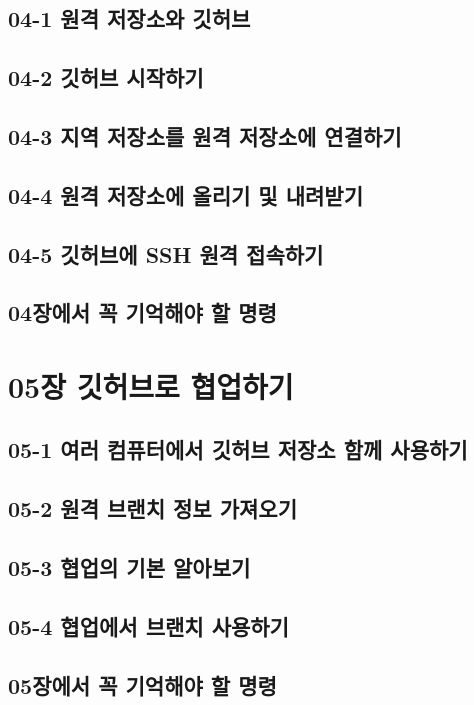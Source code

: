 \documentclass[12pt, a4paper, oneside]{book}
\let\stdsection\section
\renewcommand\section{\newpage\stdsection}
\begin{document}
		\subsection{	04-1 원격 저장소와 깃허브	}		
		\subsection{	04-2 깃허브 시작하기	}		
		\subsection{	04-3 지역 저장소를 원격 저장소에 연결하기	}		
		\subsection{	04-4 원격 저장소에 올리기 및 내려받기	}		
		\subsection{	04-5 깃허브에 SSH 원격 접속하기	}		
		\subsection{	04장에서 꼭 기억해야 할 명령	}		
						
		\section{	05장 깃허브로 협업하기	}		
		\subsection{	05-1 여러 컴퓨터에서 깃허브 저장소 함께 사용하기	}		
		\subsection{	05-2 원격 브랜치 정보 가져오기	}		
		\subsection{	05-3 협업의 기본 알아보기	}		
		\subsection{	05-4 협업에서 브랜치 사용하기	}		
		\subsection{	05장에서 꼭 기억해야 할 명령	}		
						
\end{document}
